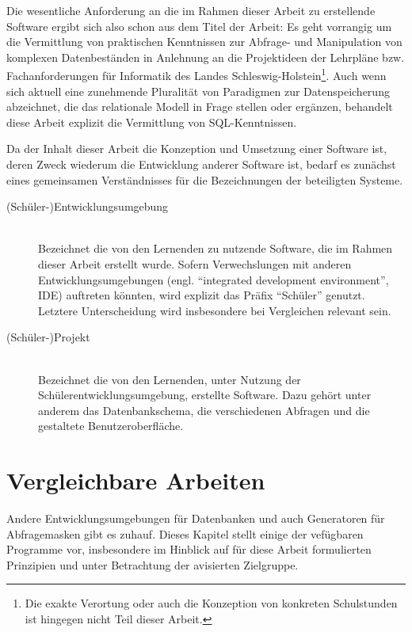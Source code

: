 \documentclass[paper=a4,fontsize=11pt,parskip=half]{scrartcl}
\begin{document}
Die wesentliche Anforderung an die im Rahmen dieser Arbeit zu erstellende Software ergibt sich also schon aus dem Titel der Arbeit: Es geht vorrangig um die Vermittlung von praktischen Kenntnissen zur Abfrage- und Manipulation von komplexen Datenbeständen in Anlehnung an die Projektideen der Lehrpläne \cite{lehrplan-inf-sek-1} bzw. Fachanforderungen \cite{lehrplan-inf-sek-2} für Informatik des Landes Schleswig-Holstein\footnote{Die exakte Verortung oder auch die Konzeption von konkreten Schulstunden ist hingegen nicht Teil dieser Arbeit.}. Auch wenn sich aktuell eine zunehmende Pluralität von Paradigmen zur Datenspeicherung abzeichnet, die das relationale Modell in Frage stellen oder ergänzen, behandelt diese Arbeit explizit die Vermittlung von SQL-Kenntnissen. 

Da der Inhalt dieser Arbeit die Konzeption und Umsetzung einer Software ist, deren Zweck wiederum die Entwicklung anderer Software ist, bedarf es zunächst eines gemeinsamen Verständnisses für die Bezeichnungen der beteiligten Systeme.

\begin{description}
\item[(Schüler-)Entwicklungsumgebung] \hfill\\ 
  Bezeichnet die von den Lernenden zu nutzende Software, die im Rahmen dieser Arbeit erstellt wurde. Sofern Verwechslungen mit anderen Entwicklungsumgebungen (engl. ``integrated development environment'', IDE) auftreten könnten, wird explizit das Präfix ``Schüler'' genutzt. Letztere Unterscheidung wird insbesondere bei Vergleichen relevant sein.
\item[(Schüler-)Projekt] \hfill\\
  Bezeichnet die von den Lernenden, unter Nutzung der Schülerentwicklungsumgebung, erstellte Software. Dazu gehört unter anderem das Datenbankschema, die verschiedenen Abfragen und die gestaltete Benutzeroberfläche.
\end{description}

\section{Vergleichbare Arbeiten}

Andere Entwicklungsumgebungen für Datenbanken und auch Generatoren für Abfragemasken gibt es zuhauf. Dieses Kapitel stellt einige der vefügbaren Programme vor, insbesondere im Hinblick auf für diese Arbeit formulierten Prinzipien und unter Betrachtung der avisierten Zielgruppe.
\end{document}
